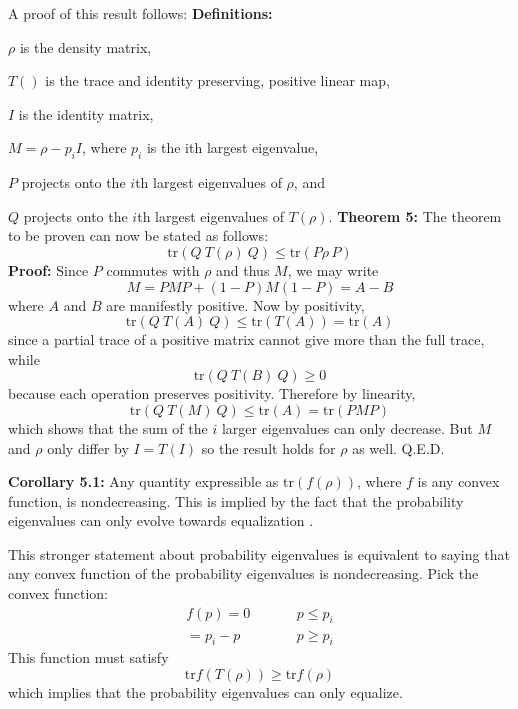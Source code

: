 \documentclass{article}
\begin{document}
A proof of this result follows:
\newline \textbf{Definitions:}

$\rho$ is the density matrix,

$T()$ is the trace and identity preserving, positive linear map, 
 
$I$ is the identity matrix, 

$M = \rho - p_{i} I$, where $p_{i}$ is the ith largest eigenvalue, 

$P$ projects onto the $i$th largest eigenvalues of $\rho$, and 

$Q$ projects onto the $i$th largest eigenvalues of $T(\rho)$.\newline
\textbf{Theorem 5:}  The theorem to be proven can now be stated as follows:
\begin{equation}
\mathrm{tr}(Q\:T(\rho)\:Q) \le \mathrm{tr}(P \rho \, P)
\end{equation}
\textbf{Proof:} Since $P$ commutes with $\rho$ and thus $M$, we may write
\begin{equation}
M = PMP + (1-P)M(1-P) = A - B
\end{equation}
where $A$ and $B$ are manifestly positive.
Now by positivity,
\begin{equation}
\mathrm{tr}(Q\:T(A)\:Q) \le \mathrm{tr}(T(A)) = \mathrm{tr}(A)
\end{equation}
since a partial trace of a positive matrix cannot give more than  
the full trace, while
\begin{equation}
\mathrm{tr}(Q\:T(B)\:Q) \ge 0
\end{equation}
because each operation preserves positivity.
Therefore by linearity, 
\begin{equation}
\mathrm{tr}(Q\:T(M)\:Q) \le \mathrm{tr}(A) = \mathrm{tr}(PMP) \label{finalstep}
\end{equation}
which shows that the sum of the $i$ larger eigenvalues can only  
decrease.  But $M$ and $\rho$ only differ by $I = T(I)$ so the result  
holds for $\rho$ as well.  Q.E.D.

\textbf{Corollary 5.1:} Any quantity expressible as $\mathrm{tr}(f(\rho))$, where $f$ is any convex function, is nondecreasing.  This is implied by the fact that the probability eigenvalues can only evolve towards equalization \cite{Uhlmann}.

This stronger statement about probability eigenvalues is equivalent to saying that any convex function of the probability eigenvalues is nondecreasing.  Pick the convex function:
\begin{eqnarray}
         f(p) = 0 \phantom{p_i - p}          & p \le p_i \label{1st} \\ 
              = p_i - p \phantom{0}          & p \ge p_i \label{2nd}
\end{eqnarray}
This function must satisfy
\begin{equation}
\mathrm{tr} f(T(\rho)) \ge \mathrm{tr} f(\rho)
\end{equation}
which implies that the probability eigenvalues can only equalize.
\end{document}
